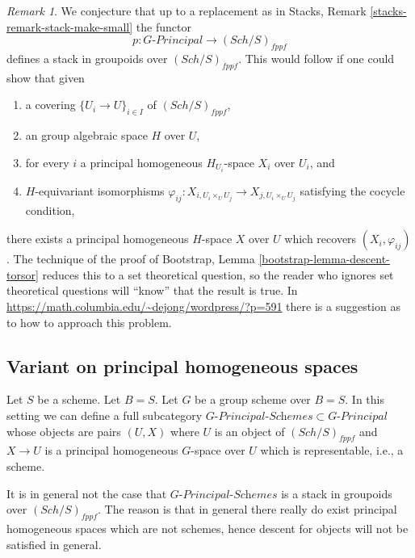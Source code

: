 \documentclass{stacks-project}
\theoremstyle{plain}
\theoremstyle{definition}
\theoremstyle{remark}
\newtheorem{remark}[subsection]{Remark}
\numberwithin{equation}{subsection}
\def\Sch{\mathit{Sch}}
\begin{document}
\begin{remark}
\label{remark-principal-stack-in-groupoids}
We conjecture that up to a replacement as in
Stacks, Remark \ref{stacks-remark-stack-make-small}
the functor
$$
p : G\textit{-Principal} \longrightarrow (\Sch/S)_{fppf}
$$
defines a stack in groupoids over $(\Sch/S)_{fppf}$. This would
follow if one could show that given
\begin{enumerate}
\item a covering $\{U_i \to U\}_{i \in I}$ of $(\Sch/S)_{fppf}$,
\item an group algebraic space $H$ over $U$,
\item for every $i$ a principal homogeneous $H_{U_i}$-space $X_i$
over $U_i$, and
\item $H$-equivariant isomorphisms
$\varphi_{ij} : X_{i, U_i \times_U U_j} \to X_{j, U_i \times_U U_j}$
satisfying the cocycle condition,
\end{enumerate}
there exists a principal homogeneous $H$-space $X$ over $U$
which recovers $(X_i, \varphi_{ij})$. The technique of the proof of
Bootstrap, Lemma \ref{bootstrap-lemma-descent-torsor}
reduces this to a set theoretical question, so the reader who ignores
set theoretical questions will ``know'' that the result is true. In
\url{https://math.columbia.edu/~dejong/wordpress/?p=591}
there is a suggestion as to how to approach this problem.
\end{remark}



\subsection{Variant on principal homogeneous spaces}
\label{subsection-variant-principal-homogeneous-spaces}

\noindent
Let $S$ be a scheme. Let $B = S$.
Let $G$ be a group scheme over $B = S$.
In this setting we can define a full subcategory
$G\textit{-Principal-Schemes} \subset G\textit{-Principal}$
whose objects are pairs $(U, X)$ where $U$ is an object of
$(\Sch/S)_{fppf}$ and $X \to U$ is a principal homogeneous
$G$-space over $U$ which is representable, i.e., a scheme.

\medskip\noindent
It is in general not the case that $G\textit{-Principal-Schemes}$ is
a stack in groupoids over $(\Sch/S)_{fppf}$. The reason is
that in general there really do exist principal homogeneous spaces
which are not schemes, hence descent for objects will not be satisfied
in general.
\end{document}

